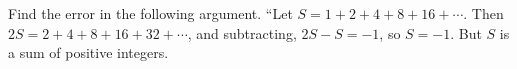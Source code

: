 Find the error in the following argument. ``Let $S=1+2+4+8+16+\cdots$. Then $2S=2+4+8+16+32+\cdots$, and subtracting, $2S-S=-1$, so $S=-1$. But $S$ is a sum of positive integers.
